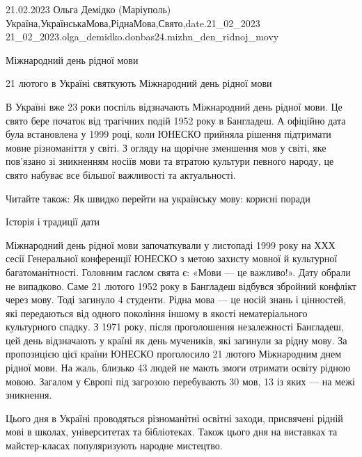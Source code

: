  
 
 
 
 

21.02.2023
Ольга Демідко (Маріуполь)
Україна,УкраїнськаМова,РіднаМова,Свято,date.21_02_2023
21_02_2023.olga_demidko.donbas24.mizhn_den_ridnoj_movy

Міжнародний день рідної мови

21 лютого в Україні святкують Міжнародний день рідної мови

В Україні вже 23 роки поспіль відзначають Міжнародний день рідної мови. Це
свято бере початок від трагічних подій 1952 року в Бангладеш. А офіційно дата
була встановлена у 1999 році, коли ЮНЕСКО прийняла рішення підтримати мовне
різноманіття у світі. З огляду на щорічне зменшення мов у світі, яке пов’язано
зі зникненням носіїв мови та втратою культури певного народу, це свято набуває
все більшої важливості та актуальності.

Читайте також: Як швидко перейти на українську мову: корисні поради

Історія і традиції дати

Міжнародний день рідної мови започаткували у листопаді 1999 року на ХХХ сесії
Генеральної конференції ЮНЕСКО з метою захисту мовної й культурної
багатоманітності. Головним гаслом свята є: «Мови — це важливо!». Дату обрали не
випадково. Саме 21 лютого 1952 року в Бангладеш відбувся збройний конфлікт
через мову. Тоді загинуло 4 студенти. Рідна мова — це носій знань і цінностей,
які передаються від одного покоління іншому в якості нематеріального
культурного спадку. З 1971 року, після проголошення незалежності Бангладеш, цей
день відзначають у країні як день мучеників, які загинули за рідну мову. За
пропозицією цієї країни ЮНЕСКО проголосило 21 лютого Міжнародним днем рідної
мови. На жаль, близько 43%
людей не мають змоги отримати освіту рідною мовою. Загалом у Європі під
загрозою перебувають 30 мов, 13 із яких — на межі зникнення.

Цього дня в Україні проводяться різноманітні освітні заходи, присвячені рідній
мові в школах, університетах та бібліотеках. Також цього дня на виставках та
майстер-класах популяризують народне мистецтво.

